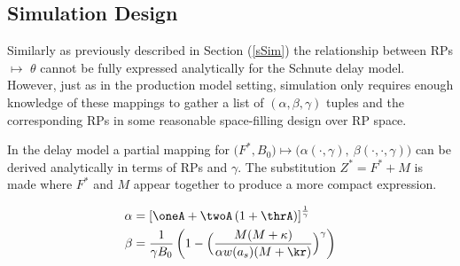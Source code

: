 %



%
\subsection{Simulation Design}


%
Similarly as previously described in Section (\ref{sSim}) the relationship 
between RPs $\mapsto$ $\theta$ cannot be fully expressed analytically for the 
Schnute delay model. However, just as in the production model setting, 
simulation only requires enough knowledge of these mappings to gather a list
of $(\alpha, \beta, \gamma)$ tuples and the corresponding RPs in some reasonable 
space-filling design over RP space. %

In the delay model a partial mapping for
$\big(F^*, B_0\big) \mapsto \big(\alpha(\cdot, \gamma), ~\beta(\cdot, \cdot, \gamma)\big)$
can be derived analytically in terms of RPs and $\gamma$. The substitution 
$Z^*=F^*+M$ is made where $F^*$ and $M$ appear together to produce a more 
compact expression.

%
\begingroup
\scriptsize
\begin{align}
\alpha & = \left[ \oneA + \twoA \left( 1 + \thrA \right) \right]^{\frac{1}{\gamma}} \label{aDelay}\\
\beta &= \frac{1}{\gamma B_0} \left( 1 - \Big(\frac{M (M + \kappa)}{\alpha w(a_s)(M + \kr)}\Big)^\gamma\right) \label{bDelay}%
\end{align}
\endgroup

